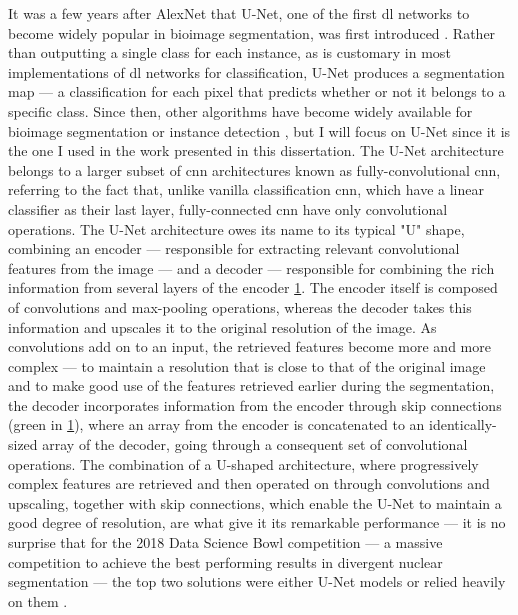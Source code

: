 It was a few years after AlexNet that U-Net, one of the first \ac{dl} networks to become widely popular in bioimage segmentation, was first introduced \cite{Ronneberger2015-do}. Rather than outputting a single class for each instance, as is customary in most implementations of \ac{dl} networks for classification, U-Net produces a segmentation map --- a classification for each pixel that predicts whether or not it belongs to a specific class. Since then, other algorithms have become widely available for bioimage segmentation or instance detection \cite{Lucas2021-hc}, but I will focus on U-Net since it is the one I used in the work presented in this dissertation. The U-Net architecture belongs to a larger subset of \ac{cnn} architectures known as fully-convolutional \ac{cnn}, referring to the fact that, unlike vanilla classification \ac{cnn}, which have a linear classifier as their last layer, fully-connected \ac{cnn} have only convolutional operations. The U-Net architecture owes its name to its typical "U" shape, combining an encoder --- responsible for extracting relevant convolutional features from the image --- and a decoder --- responsible for combining the rich information from several layers of the encoder \ref{fig:u-net}. The encoder itself is composed of convolutions and max-pooling operations, whereas the decoder takes this information and upscales it to the original resolution of the image. As convolutions add on to an input, the retrieved features become more and more complex --- to maintain a resolution that is close to that of the original image and to make good use of the features retrieved earlier during the segmentation, the decoder incorporates information from the encoder through skip connections (green in \ref{fig:u-net}), where an array from the encoder is concatenated to an identically-sized array of the decoder, going through a consequent set of convolutional operations. The combination of a U-shaped architecture, where progressively complex features are retrieved and then operated on through convolutions and upscaling, together with skip connections, which enable the U-Net to maintain a good degree of resolution, are what give it its remarkable performance --- it is no surprise that for the 2018 Data Science Bowl competition --- a massive competition to achieve the best performing results in divergent nuclear segmentation --- the top two solutions were either U-Net models or relied heavily on them \cite{Seferbekov_undated-br,jacobkie_undated-tc}. 

\begin{figure}
	\label{fig:u-net}
\end{figure}

